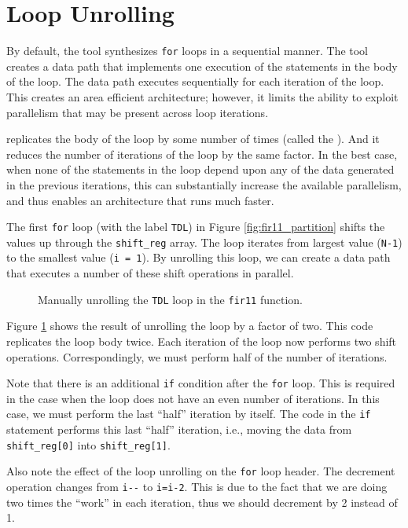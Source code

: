 \section{Loop Unrolling}
By default, the \VHLS tool synthesizes \lstinline{for} loops in a sequential manner. The tool creates a data path that implements one execution of the statements in the body of the loop. The data path executes sequentially for each iteration of the loop. This creates an area efficient architecture; however, it limits the ability to exploit parallelism that may be present across loop iterations. 

 replicates the body of the loop by some number of times (called the ). And it reduces the number of iterations of the loop by the same factor. In the best case, when none of the statements in the loop depend upon any of the data generated in the previous iterations, this can substantially increase the available parallelism, and thus enables an architecture that runs much faster. 

The first \lstinline{for} loop (with the label \lstinline{TDL}) in Figure \ref{fig:fir11_partition} shifts the values up through the \lstinline{shift_reg} array. The loop iterates from largest value (\lstinline{N-1}) to the smallest value (\lstinline{i = 1}). By unrolling this loop, we can create a data path that executes a number of these shift operations in parallel. 

\begin{figure}

\caption{ Manually unrolling the \lstinline{TDL} loop in the \lstinline{fir11} function.  }
\label{fig:fir11_unrollTDL}
\end{figure}

Figure \ref{fig:fir11_unrollTDL} shows the result of unrolling the loop by a factor of two. This code replicates the loop body twice. Each iteration of the loop now performs two shift operations. Correspondingly, we must perform half of the number of iterations.

Note that there is an additional \lstinline{if} condition after the \lstinline{for} loop. This is required in the case when the loop does not have an even number of iterations. In this case, we must perform the last ``half'' iteration by itself. The code in the \lstinline{if} statement performs this last ``half'' iteration, i.e., moving the data from \lstinline{shift_reg[0]} into \lstinline{shift_reg[1]}.

Also note the effect of the loop unrolling on the \lstinline{for} loop header. The decrement operation changes from \lstinline{i--} to \lstinline{i=i-2}. This is due to the fact that we are doing two times the ``work'' in each iteration, thus we should decrement by 2 instead of 1.

